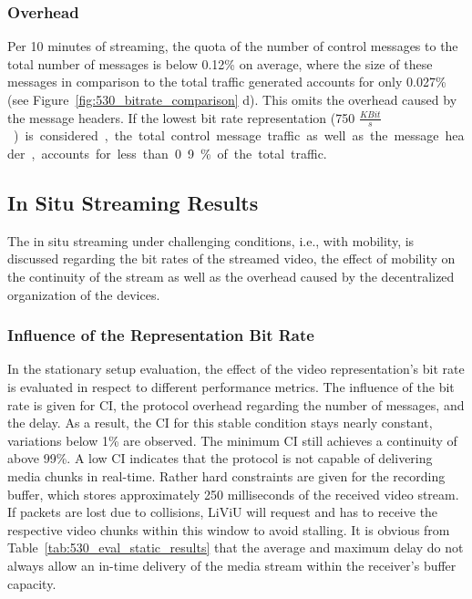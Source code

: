 \subsubsection{Overhead}
Per 10 minutes of streaming, the quota of the number of control messages to the total number of messages is below 0.12\% on average, where the size of these messages in comparison to the total traffic generated accounts for only 0.027\%  (see Figure~\ref{fig:530_bitrate_comparison} d). 
This omits the overhead caused by the message headers.
If the lowest bit rate representation (750 \unit{$\frac{KBit}{s}$}) is considered, the total control message traffic as well as the message header, accounts for less than 0.9\% of the total traffic.
\subsection{In Situ Streaming Results}
The in situ streaming under challenging conditions, i.e., with mobility, is discussed regarding the bit rates of the streamed video, the effect of mobility on the continuity of the stream as well as the overhead caused by the decentralized organization of the devices.
\subsubsection{Influence of the Representation Bit Rate}
In the stationary setup evaluation, the effect of the video representation's bit rate is evaluated in respect to different performance metrics. 
The influence of the bit rate is given for \ac{CI}, the protocol overhead regarding the number of messages, and the delay.
As a result, the \ac{CI} for this stable condition stays nearly constant, variations below 1\% are observed.
The minimum \ac{CI} still achieves a continuity of above 99\%.
A low \ac{CI} indicates that the protocol is not capable of delivering media chunks in real-time.
Rather hard constraints are given for the recording buffer, which stores approximately 250 milliseconds of the received video stream. 
If packets are lost due to collisions, \ac{LiViU} will request and has to receive the respective video chunks within this window to avoid stalling.
It is obvious from Table~\ref{tab:530_eval_static_results} that the average and maximum delay do not always allow an in-time delivery of the media stream within the receiver's buffer capacity.

